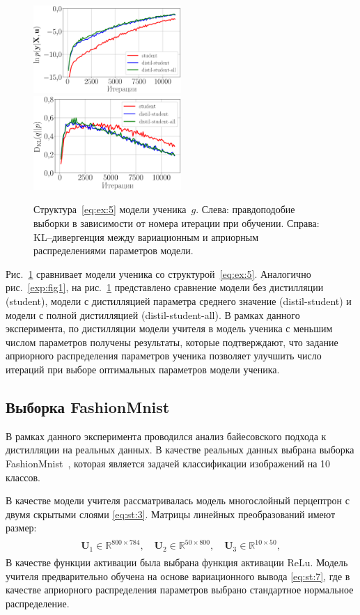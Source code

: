 \documentclass[12pt]{a&t}
\begin{document}
\begin{figure}[h!]
\includegraphics[width=0.5\textwidth]{synthetic_likelihood_2_layers.eps}
\includegraphics[width=0.5\textwidth]{synthetic_D_KL_2_layers.eps}
\caption{Структура~\eqref{eq:ex:5} модели ученика~$g$. Слева: правдоподобие выборки в зависимости от номера итерации при обучении. Справа: KL--дивергенция между вариационным и априорным распределениями параметров модели.}
\label{exp:fig2}
\end{figure}

Рис.~\ref{exp:fig2} сравнивает модели ученика со структурой~\eqref{eq:ex:5}. Аналогично рис.~\ref{exp:fig1}, на рис.~\ref{exp:fig2} представлено сравнение модели без дистилляции (student), модели с дистилляцией параметра среднего значение (distil-student) и модели с полной дистилляцией (distil-student-all). В рамках данного эксперимента, по дистилляции модели учителя в модель ученика с меньшим числом параметров получены результаты, которые подтверждают, что задание априорного распределения параметров ученика позволяет улучшить число итераций при выборе оптимальных параметров модели ученика.

\subsection{Выборка FashionMnist}

В рамках данного эксперимента проводился анализ байесовского подхода к дистилляции на реальных данных.  В качестве реальных данных выбрана выборка FashionMnist~\cite{fashionmnist}, которая является задачей классификации изображений на 10 классов.

В качестве модели учителя рассматривалась модель многослойный перцептрон с двумя скрытыми слоями \eqref{eq:st:3}. Матрицы линейных преобразований имеют размер:
\begin{gather}
\label{eq:ex:7}
\begin{aligned}
\mathbf{U}_{1} \in \mathbb{R}^{800 \times 784}, \quad \mathbf{U}_{2} \in \mathbb{R}^{50 \times 800}, \quad \mathbf{U}_{3} \in \mathbb{R}^{10 \times 50},
\end{aligned}
\end{gather}
В качестве функции активации была выбрана функция активации $\text{ReLu}$.
Модель учителя предварительно обучена на основе вариационного вывода \eqref{eq:st:7}, где в качестве априорного распределения параметров выбрано стандартное нормальное распределение.
\end{document}
